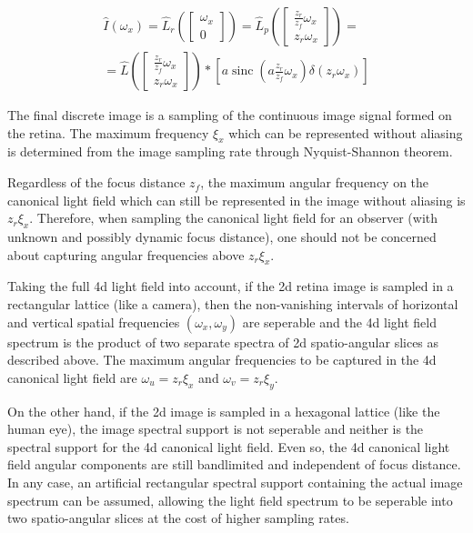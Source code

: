 \documentclass[acmtog,review,anonymous]{acmart}
\DeclareMathOperator{\sinc}{sinc}
\begin{document}
\begin{equation} \label{eq:imagespectrum2}
\begin{split}
\hat{I}(\omega_{x}) = \hat{L}_{r}\left(\begin{bmatrix}\omega_{x}\\0\end{bmatrix}\right) =
\hat{L}_{p}\left(\begin{bmatrix}\frac{z_{r}}{z_{f}}\omega_{x}\\z_{r}\omega_{x}\end{bmatrix}\right) =\\
= \hat{L}\left(\begin{bmatrix}\frac{z_{r}}{z_{f}}\omega_{x}\\z_{r}\omega_{x}\end{bmatrix}\right) \ast \left[ a \sinc\left(a \frac{z_{r}}{z_{f}} \omega_{x}\right) \delta(z_{r} \omega_{x}) \right]
\end{split}
\end{equation}

The final discrete image is a sampling of the continuous image signal formed on the retina. The maximum frequency $\xi_{x}$ which can be represented without aliasing is determined from the image sampling rate through Nyquist-Shannon theorem.

Regardless of the focus distance $z_{f}$, the maximum angular frequency on the canonical light field which can still be represented in the image without aliasing is $z_{r} \xi_{x}$. Therefore, when sampling the canonical light field for an observer (with unknown and possibly dynamic focus distance), one should not be concerned about capturing angular frequencies above $z_{r} \xi_{x}$.

Taking the full 4d light field into account, if the 2d retina image is sampled in a rectangular lattice (like a camera), then the non-vanishing intervals of horizontal and vertical spatial frequencies $(\omega_{x}, \omega_{y})$ are seperable and the 4d light field spectrum is the product of two separate spectra of 2d spatio-angular slices as described above. The maximum angular frequencies to be captured in the 4d canonical light field are $\omega_{u} = z_{r} \xi_{x}$ and $\omega_{v} = z_{r} \xi_{y}$.

On the other hand, if the 2d image is sampled in a hexagonal lattice (like the human eye), the image spectral support is not seperable and neither is the spectral support for the 4d canonical light field. Even so, the 4d canonical light field angular components are still bandlimited and independent of focus distance. In any case, an artificial rectangular spectral support containing the actual image spectrum can be assumed, allowing the light field spectrum to be seperable into two spatio-angular slices at the cost of higher sampling rates.
\end{document}
